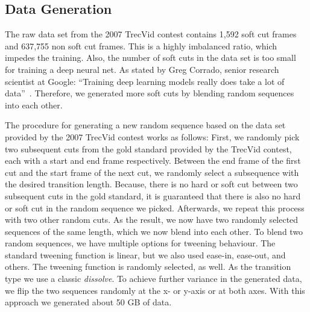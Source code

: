 \subsection{Data Generation}
\label{sec:soft_cut_data_generation}

The raw data set from the 2007 TrecVid contest contains 1,592 soft cut frames and 637,755 non soft cut frames.
This is a highly imbalanced ratio, which impedes the training.
Also, the number of soft cuts in the data set is too small for training a deep neural net.
As stated by Greg Corrado, senior research scientist at Google: ``Training deep learning models really does take a lot of data''~\cite{dataDeepNeuralNets}.
Therefore, we generated more soft cuts by blending random sequences into each other.

The procedure for generating a new random sequence based on the data set provided by the 2007 TrecVid contest works as follows:
First, we randomly pick two subsequent cuts from the gold standard provided by the TrecVid contest, each with a start and end frame respectively.
Between the end frame of the first cut and the start frame of the next cut, we randomly select a subsequence with the desired transition length.
Because, there is no hard or soft cut between two subsequent cuts in the gold standard, it is guaranteed that there is also no hard or soft cut in the random sequence we picked.
Afterwards, we repeat this process with two other random cuts.
As the result, we now have two randomly selected sequences of the same length, which we now blend into each other.
To blend two random sequences, we have multiple options for tweening behaviour.
The standard tweening function is linear, but we also used ease-in, ease-out, and others. %
The tweening function is randomly selected, as well.
As the transition type we use a classic \textit{dissolve}.
To achieve further variance in the generated data, we flip the two sequences randomly at the x- or y-axis or at both axes.
With this approach we generated about 50 GB of data.

